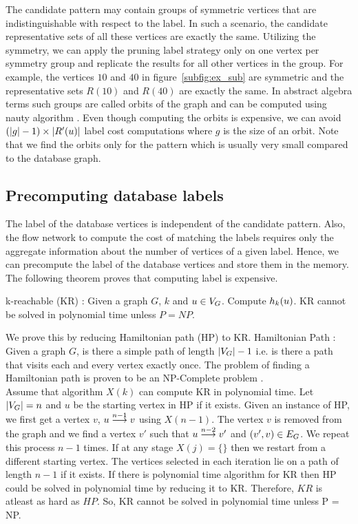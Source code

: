 The candidate pattern may contain groups of
symmetric vertices that are indistinguishable with respect to the \khop label.
In such a scenario, the candidate representative sets of all these vertices are
exactly the same. Utilizing the symmetry, we can apply the pruning label strategy only on
one vertex per symmetry group and replicate the results for all other vertices
in the group. For example, the vertices $10$ and $40$ in
figure~\ref{subfig:ex_sub} are symmetric and the representative sets $R(10)$
and $R(40)$ are exactly the same.  In abstract algebra terms such  groups are
called orbits of the graph and can be computed using nauty algorithm
\cite{nauty}. 
Even
though computing the orbits is expensive, we can avoid $ (|g|-1) \times |\CR|$
\ncl label cost computations where $g$ is the size of an orbit. Note that
we find the orbits only for the pattern which is usually very small compared
to the database graph.

\subsection{Precomputing database \khop labels} The \khop label of the database
vertices is independent of the candidate pattern.
Also, the flow network to compute the cost of matching the \khop labels requires
only the aggregate information about the number of vertices of a given label.
Hence, we can precompute the \khop label of the database vertices and store them
in the memory. The following theorem proves that computing \khop label is
expensive.

\begin{thm} k-reachable (KR) : Given a graph $G$, $k$ and $u \in \vg$. Compute
    $\khopl{k}{u}$.  KR cannot be solved in polynomial time unless $P =
    NP$.

\begin{myproof} We prove this by reducing Hamiltonian path (HP) to KR.
    Hamiltonian Path : Given a graph $G$, is there a simple path of length
    $|\vg|-1$ i.e. is there a path that visits each and every vertex exactly
    once. The problem of finding a Hamiltonian path is proven to be an
    NP-Complete problem \cite{npcomplete}.\\ Assume that algorithm $X(k)$ can
    compute KR in polynomial time. Let $|\vg| = n$ and $u$ be the starting
    vertex in HP if it exists.  Given an instance of HP, we first get a vertex
    $v$, $\kpath{u}{v}{n-1}$ using $X(n-1)$. The vertex $v$ is removed from the
    graph and we find a vertex $v'$ such that $\kpath{u}{v'}{n-2}$ and $(v', v)
    \in \eg$. We repeat this process $n-1$ times. If at any stage $X(j) = \{\}$
    then we restart from a different starting vertex. The vertices selected in
    each iteration lie on a path of length $n-1$ if it exists. If there is
    polynomial time algorithm for KR then HP could be solved in polynomial time
    by reducing it to KR. Therefore, $KR$ is atleast as hard as $HP$.
    So, KR cannot be solved in polynomial time unless
    P = NP.
\end{myproof}
\end{thm}

